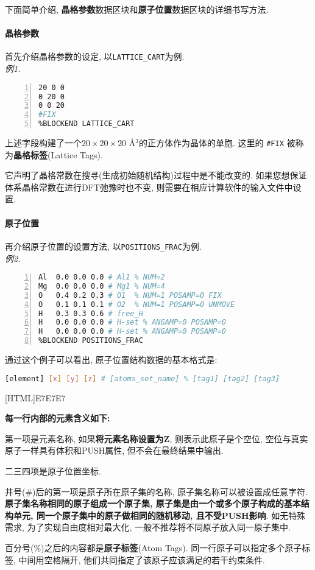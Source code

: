 \documentclass[a4paper, 10pt]{article}
\begin{document}
下面简单介绍, \textbf{晶格参数}数据区块和\textbf{原子位置}数据区块的详细书写方法.

\paragraph{晶格参数} 首先介绍晶格参数的设定, 以\verb|LATTICE_CART|为例.\\
\emph{例1.}
\begin{lstlisting}[language={bash},numbers=left]
%BLOCK LATTICE_CART
20 0 0
0 20 0
0 0 20
#FIX
%BLOCKEND LATTICE_CART
\end{lstlisting}

上述字段构建了一个\(20\times20\times20\) \r{A}\(^3\)的正方体作为晶体的单胞. 这里的 \verb|#FIX| 被称为\textbf{晶格标签}(Lattice Tags). 

它声明了晶格常数在搜寻(生成初始随机结构)过程中是不能改变的. 如果您想保证体系晶格常数在进行DFT弛豫时也不变, 则需要在相应计算软件的输入文件中设置.

\paragraph{原子位置} 再介绍原子位置的设置方法, 以\verb|POSITIONS_FRAC|为例.\\
\emph{例2.}
\hypertarget{Aotic Package}{\ }
\begin{lstlisting}[language={bash},numbers=left]
%BLOCK POSITIONS_FRAC
Al  0.0 0.0 0.0 # Al1 % NUM=2 
Mg  0.0 0.0 0.0 # Mg1 % NUM=4 
O   0.4 0.2 0.3 # O1  % NUM=1 POSAMP=0 FIX
O   0.1 0.1 0.1 # O2  % NUM=1 POSAMP=0 UNMOVE
H   0.3 0.3 0.6 # free_H 
H   0.0 0.0 0.0 # H-set % ANGAMP=0 POSAMP=0
H   0.0 0.0 0.0 # H-set % ANGAMP=0 POSAMP=0
%BLOCKEND POSITIONS_FRAC
\end{lstlisting}

通过这个例子可以看出, 原子位置结构数据的基本格式是:
\begin{lstlisting}[language={bash}]
[element] [x] [y] [z] # [atoms_set_name] % [tag1] [tag2] [tag3]
\end{lstlisting}

\noindent{}[HTML]{E7E7E7}{\parbox{\textwidth}{%
\noindent \textbf{每一行内部的元素含义如下: }
\begin{maineu}
  \item 第一项是元素名称, 如果\textbf{将元素名称设置为Z}, 则表示此原子是个空位, 空位与真实原子一样具有体积和PUSH属性, 但不会在最终结果中输出.
  \item 二三四项是原子位置坐标.
  \item 井号(\#)后的第一项是原子所在原子集的名称, 原子集名称可以被设置成任意字符. \textbf{原子集名称相同的原子组成一个原子集, 原子集是由一个或多个原子构成的基本结构单元, 同一个原子集中的原子做相同的随机移动, 且不受PUSH影响}. 如无特殊需求, 为了实现自由度相对最大化, 一般不推荐将不同原子放入同一原子集中.
  \item 百分号(\%)之后的内容都是\textbf{原子标签}(Atom Tags). 同一行原子可以指定多个原子标签, 中间用空格隔开, 他们共同指定了该原子应该满足的若干约束条件.
\end{maineu}}}\\
\end{document}
